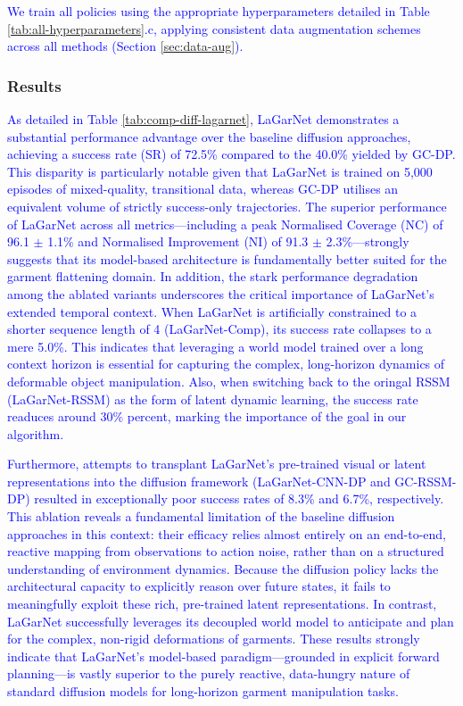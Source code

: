 \documentclass[journal]{IEEEtran}
\newcommand{\addadvantage}[1]{\textcolor{blue}{#1}}
\begin{document}
\addadvantage{We train all policies using the appropriate hyperparameters detailed in Table \ref{tab:all-hyperparameters}.c, applying consistent data augmentation schemes across all methods (Section \ref{sec:data-aug}).}

\subsubsection{Results} \label{sec:diff-result}

\addadvantage{As detailed in Table \ref{tab:comp-diff-lagarnet}, LaGarNet demonstrates a substantial performance advantage over the baseline diffusion approaches, achieving a success rate (SR) of 72.5\% compared to the 40.0\% yielded by GC-DP. This disparity is particularly notable given that LaGarNet is trained on 5,000 episodes of mixed-quality, transitional data, whereas GC-DP utilises an equivalent volume of strictly success-only trajectories. The superior performance of LaGarNet across all metrics—including a peak Normalised Coverage (NC) of 96.1 $\pm$ 1.1\% and Normalised Improvement (NI) of 91.3 $\pm$ 2.3\%—strongly suggests that its model-based architecture is fundamentally better suited for the garment flattening domain. }
\addadvantage{In addition, the stark performance degradation among the ablated variants underscores the critical importance of LaGarNet's extended temporal context. When LaGarNet is artificially constrained to a shorter sequence length of 4 (LaGarNet-Comp), its success rate collapses to a mere 5.0\%. This indicates that leveraging a world model trained over a long context horizon is essential for capturing the complex, long-horizon dynamics of deformable object manipulation. Also, when switching back to the oringal RSSM (LaGarNet-RSSM) as the form of latent dynamic learning, the success rate readuces around 30\% percent, marking the importance of the goal in our algorithm. }

\addadvantage{Furthermore, attempts to transplant LaGarNet's pre-trained visual or latent representations into the diffusion framework (LaGarNet-CNN-DP and GC-RSSM-DP) resulted in exceptionally poor success rates of 8.3\% and 6.7\%, respectively. This ablation reveals a fundamental limitation of the baseline diffusion approaches in this context: their efficacy relies almost entirely on an end-to-end, reactive mapping from observations to action noise, rather than on a structured understanding of environment dynamics. Because the diffusion policy lacks the architectural capacity to explicitly reason over future states, it fails to meaningfully exploit these rich, pre-trained latent representations. In contrast, LaGarNet successfully leverages its decoupled world model to anticipate and plan for the complex, non-rigid deformations of garments. These results strongly indicate that LaGarNet's model-based paradigm—grounded in explicit forward planning—is vastly superior to the purely reactive, data-hungry nature of standard diffusion models for long-horizon garment manipulation tasks.}
\end{document}
